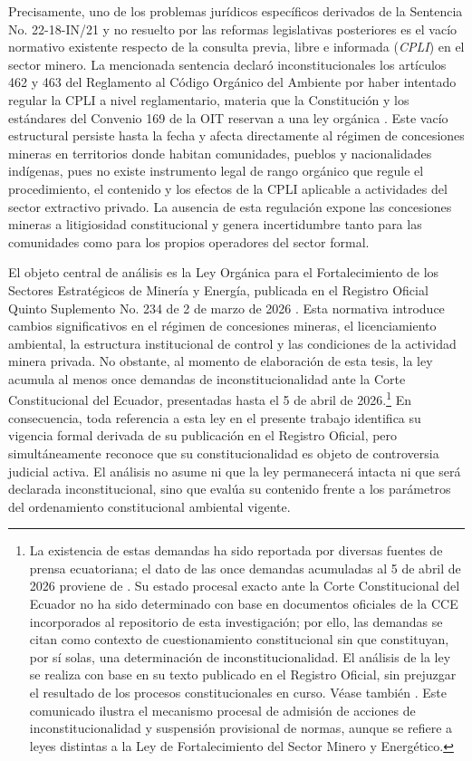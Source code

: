 Precisamente, uno de los problemas jurídicos específicos derivados de la Sentencia No. 22-18-IN/21 y no resuelto por las reformas legislativas posteriores es el vacío normativo existente respecto de la consulta previa, libre e informada (\textit{CPLI}) en el sector minero. La mencionada sentencia declaró inconstitucionales los artículos 462 y 463 del Reglamento al Código Orgánico del Ambiente por haber intentado regular la CPLI a nivel reglamentario, materia que la Constitución y los estándares del Convenio 169 de la OIT reservan a una ley orgánica \parencite{cce_22_18_in_21}. Este vacío estructural persiste hasta la fecha y afecta directamente al régimen de concesiones mineras en territorios donde habitan comunidades, pueblos y nacionalidades indígenas, pues no existe instrumento legal de rango orgánico que regule el procedimiento, el contenido y los efectos de la CPLI aplicable a actividades del sector extractivo privado. La ausencia de esta regulación expone las concesiones mineras a litigiosidad constitucional y genera incertidumbre tanto para las comunidades como para los propios operadores del sector formal.

El objeto central de análisis es la Ley Orgánica para el Fortalecimiento de los Sectores Estratégicos de Minería y Energía, publicada en el Registro Oficial Quinto Suplemento No. 234 de 2 de marzo de 2026 \parencite{ley_fortalecimiento_2026}. Esta normativa introduce cambios significativos en el régimen de concesiones mineras, el licenciamiento ambiental, la estructura institucional de control y las condiciones de la actividad minera privada. No obstante, al momento de elaboración de esta tesis, la ley acumula al menos once demandas de inconstitucionalidad ante la Corte Constitucional del Ecuador, presentadas hasta el 5 de abril de 2026.\footnote{La existencia de estas demandas ha sido reportada por diversas fuentes de prensa ecuatoriana; el dato de las once demandas acumuladas al 5 de abril de 2026 proviene de \parencite{primicias_demandas_2026}. Su estado procesal exacto ante la Corte Constitucional del Ecuador no ha sido determinado con base en documentos oficiales de la CCE incorporados al repositorio de esta investigación; por ello, las demandas se citan como contexto de cuestionamiento constitucional sin que constituyan, por sí solas, una determinación de inconstitucionalidad. El análisis de la ley se realiza con base en su texto publicado en el Registro Oficial, sin prejuzgar el resultado de los procesos constitucionales en curso. Véase también \textcite{cce_comunicado_agosto2025}. Este comunicado ilustra el mecanismo procesal de admisión de acciones de inconstitucionalidad y suspensión provisional de normas, aunque se refiere a leyes distintas a la Ley de Fortalecimiento del Sector Minero y Energético.} En consecuencia, toda referencia a esta ley en el presente trabajo identifica su vigencia formal derivada de su publicación en el Registro Oficial, pero simultáneamente reconoce que su constitucionalidad es objeto de controversia judicial activa. El análisis no asume ni que la ley permanecerá intacta ni que será declarada inconstitucional, sino que evalúa su contenido frente a los parámetros del ordenamiento constitucional ambiental vigente.

